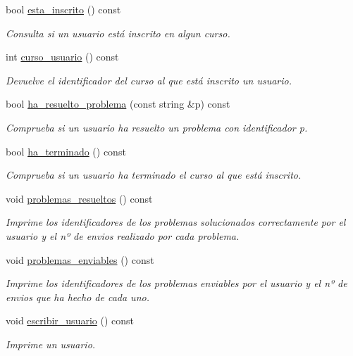 \begin{DoxyCompactItemize}
bool \mbox{\hyperlink{class_usuario_a35628c962b0db48ebcb85cd2eb186894}{esta\+\_\+inscrito}} () const
\begin{DoxyCompactList}\small\item\em Consulta si un usuario está inscrito en algun curso. \end{DoxyCompactList}\item 
int \mbox{\hyperlink{class_usuario_aa8b3fb5f9ab3b36a2173b32b265f19c5}{curso\+\_\+usuario}} () const
\begin{DoxyCompactList}\small\item\em Devuelve el identificador del curso al que está inscrito un usuario. \end{DoxyCompactList}\item 
bool \mbox{\hyperlink{class_usuario_a6f9608eac6a6a05d850dcad07bdf37f3}{ha\+\_\+resuelto\+\_\+problema}} (const string \&p) const
\begin{DoxyCompactList}\small\item\em Comprueba si un usuario ha resuelto un problema con identificador p. \end{DoxyCompactList}\item 
bool \mbox{\hyperlink{class_usuario_aae8ff05308f5cc1e5f4267c577da386e}{ha\+\_\+terminado}} () const
\begin{DoxyCompactList}\small\item\em Comprueba si un usuario ha terminado el curso al que está inscrito. \end{DoxyCompactList}\item 
void \mbox{\hyperlink{class_usuario_a11b719ee95e8089a4f34c172c81f2a5b}{problemas\+\_\+resueltos}} () const
\begin{DoxyCompactList}\small\item\em Imprime los identificadores de los problemas solucionados correctamente por el usuario y el nº de envios realizado por cada problema. \end{DoxyCompactList}\item 
void \mbox{\hyperlink{class_usuario_a79c8b5d178c8cfe7604210dc38d41fa1}{problemas\+\_\+enviables}} () const
\begin{DoxyCompactList}\small\item\em Imprime los identificadores de los problemas enviables por el usuario y el nº de envios que ha hecho de cada uno. \end{DoxyCompactList}\item 
void \mbox{\hyperlink{class_usuario_a01715cdd7442952ccb578cd7dfa85a09}{escribir\+\_\+usuario}} () const
\begin{DoxyCompactList}\small\item\em Imprime un usuario. \end{DoxyCompactList}\end{DoxyCompactItemize}
